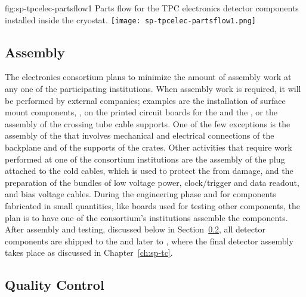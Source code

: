 \begin{dunefigure}
{fig:sp-tpcelec-partsflow1}
{Parts flow for the TPC electronics detector components installed inside the cryostat.}
\texttt{[image: sp-tpcelec-partsflow1.png]}
\end{dunefigure}


\subsection{Assembly}
\label{sec:fdsp-tpcelec-production-assembly}

The  electronics consortium plans to minimize
the amount of assembly work at any one of the participating
institutions. When assembly work is required, it will be performed
by external companies; examples are the installation of surface 
mount components, ,  on the printed 
circuit boards for the  and the , or
the assembly of the crossing tube cable supports. One of the few
exceptions is the assembly of the  that involves
mechanical and electrical connections of the backplane and of
the supports of the crates. Other activities that require 
work performed at one of the consortium institutions are the
assembly of the plug attached to the cold cables, which is used to protect
the  from  damage, and the preparation of
the bundles of low voltage power, clock/trigger and data readout,
and bias voltage cables. During the engineering
phase and for components fabricated in small quantities, 
like boards used for testing other components, the plan is to
have one of the consortium's institutions assemble the components.
After assembly and testing, discussed below in Section~\ref{sec:fdsp-tpcelec-production-qc},
all detector components are shipped to the  and
later to , where the final detector assembly
takes place as discussed in Chapter~\ref{ch:sp-tc}.

\subsection{Quality Control}
\label{sec:fdsp-tpcelec-production-qc}

